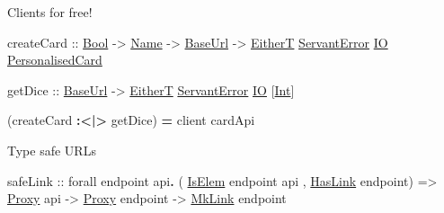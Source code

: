 \documentclass[ignorenonframetext,]{beamer}
\newenvironment{Shaded}{}{}
\newcommand{\DataTypeTok}[1]{\underline{{#1}}}
\newcommand{\OtherTok}[1]{{#1}}
\newcommand{\FunctionTok}[1]{\textcolor[rgb]{1.00,0.58,0.35}{\textbf{{#1}}}}
\newcommand{\NormalTok}[1]{{#1}}
\begin{document}
\begin{frame}[fragile]{Clients for free!}

\begin{Shaded}
\begin{Highlighting}[]
\NormalTok{createCard}
\OtherTok{    ::} \DataTypeTok{Bool}
    \OtherTok{->} \DataTypeTok{Name}
    \OtherTok{->} \DataTypeTok{BaseUrl}
    \OtherTok{->} \DataTypeTok{EitherT} \DataTypeTok{ServantError} \DataTypeTok{IO} \DataTypeTok{PersonalisedCard}

\NormalTok{getDice}
\OtherTok{    ::} \DataTypeTok{BaseUrl}
    \OtherTok{->} \DataTypeTok{EitherT} \DataTypeTok{ServantError} \DataTypeTok{IO} \NormalTok{[}\DataTypeTok{Int}\NormalTok{]}

\NormalTok{(createCard }\FunctionTok{:<|>} \NormalTok{getDice) }\FunctionTok{=} \NormalTok{client cardApi}
\end{Highlighting}
\end{Shaded}

\end{frame}

\begin{frame}[fragile]{Type safe URLs}

\begin{Shaded}
\begin{Highlighting}[]
\NormalTok{safeLink}
\OtherTok{    ::} \NormalTok{forall endpoint api}\FunctionTok{.} \NormalTok{( }\DataTypeTok{IsElem} \NormalTok{endpoint api}
                            \NormalTok{, }\DataTypeTok{HasLink} \NormalTok{endpoint)}
    \OtherTok{=>} \DataTypeTok{Proxy} \NormalTok{api}
    \OtherTok{->} \DataTypeTok{Proxy} \NormalTok{endpoint}
    \OtherTok{->} \DataTypeTok{MkLink} \NormalTok{endpoint}
\end{Highlighting}
\end{Shaded}

\end{frame}
\end{document}
